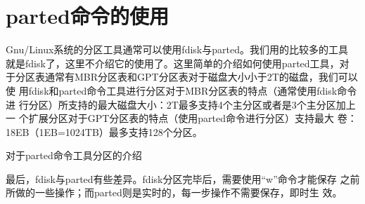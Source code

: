 
\section{parted命令的使用}
\label{sec:PartedCmd}

Gnu/Linux系统的分区工具通常可以使用fdisk与parted。我们用的比较多的工具
就是fdisk了，这里不介绍它的使用了。这里简单的介绍如何使用parted工具，对
于分区表通常有MBR分区表和GPT分区表对于磁盘大小小于2T的磁盘，我们可以使
用fdisk和parted命令工具进行分区对于MBR分区表的特点（通常使用fdisk命令进
行分区）所支持的最大磁盘大小：2T最多支持4个主分区或者是3个主分区加上一
个扩展分区对于GPT分区表的特点（使用parted命令进行分区）支持最大
卷：18EB（1EB=1024TB）最多支持128个分区。

对于parted命令工具分区的介绍

最后，fdisk与parted有些差异。fdisk分区完毕后，需要使用“w”命令才能保存
之前所做的一些操作；而parted则是实时的，每一步操作不需要保存，即时生
效。